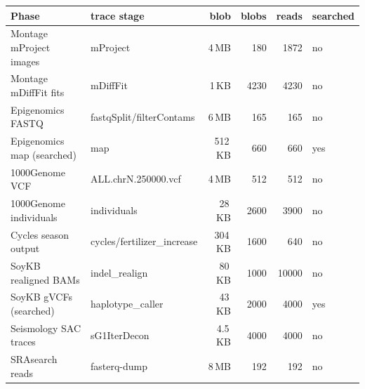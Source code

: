 \begin{tabular}{llrrrl}
\toprule
Phase & trace stage & blob & blobs & reads & searched \\
\midrule
Montage mProject images & mProject & 4\,MB & 180 & 1872 & no \\
Montage mDiffFit fits & mDiffFit & 1\,KB & 4230 & 4230 & no \\
Epigenomics FASTQ & fastqSplit/filterContams & 6\,MB & 165 & 165 & no \\
Epigenomics map (searched) & map & 512\,KB & 660 & 660 & yes \\
1000Genome VCF & ALL.chrN.250000.vcf & 4\,MB & 512 & 512 & no \\
1000Genome individuals & individuals & 28\,KB & 2600 & 3900 & no \\
Cycles season output & cycles/fertilizer\_increase & 304\,KB & 1600 & 640 & no \\
SoyKB realigned BAMs & indel\_realign & 80\,KB & 1000 & 10000 & no \\
SoyKB gVCFs (searched) & haplotype\_caller & 43\,KB & 2000 & 4000 & yes \\
Seismology SAC traces & sG1IterDecon & 4.5\,KB & 4000 & 4000 & no \\
SRAsearch reads & fasterq-dump & 8\,MB & 192 & 192 & no \\
\bottomrule
\end{tabular}
